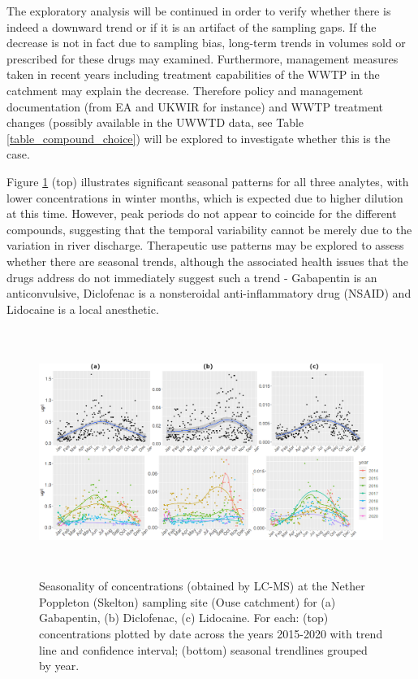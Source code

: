 \documentclass{article}
\begin{document}
The exploratory analysis will be continued in order to verify whether there is indeed a downward trend or if it is an artifact of the sampling gaps. 
If the decrease is not in fact due to sampling bias, long-term trends in volumes sold or prescribed for these drugs may examined. Furthermore, management measures taken in recent years including treatment capabilities of the WWTP in the catchment may explain the decrease. Therefore policy and management documentation (from EA and UKWIR for instance) and WWTP treatment changes (possibly available in the UWWTD data, see Table \ref{table_compound_choice}) will be explored to investigate whether this is the case.

Figure \ref{fig_ouse_site_seasonality} (top) illustrates significant seasonal patterns for all three analytes, with lower concentrations in winter months, which is expected due to higher dilution at this time. However, peak periods do not appear to coincide for the different compounds, suggesting that the temporal variability cannot be merely due to the variation in river discharge. Therapeutic use patterns may be explored to assess whether there are seasonal trends, although the associated health issues that the drugs address do not immediately suggest such a trend - Gabapentin is an anticonvulsive, Diclofenac is a nonsteroidal anti-inflammatory drug (NSAID) and Lidocaine is a local anesthetic.

\begin{figure}[!hb]
    \centering
    \includegraphics[height=8cm]{fig_seasonality.png}
    \caption{Seasonality of concentrations (obtained by LC-MS) at the Nether Poppleton (Skelton) sampling site (Ouse catchment) for (a) Gabapentin, (b) Diclofenac, (c) Lidocaine. For each: (top) concentrations plotted by date across the years 2015-2020 with trend line and confidence interval; (bottom) seasonal trendlines grouped by year.}
    \label{fig_ouse_site_seasonality}
\end{figure}
\end{document}
